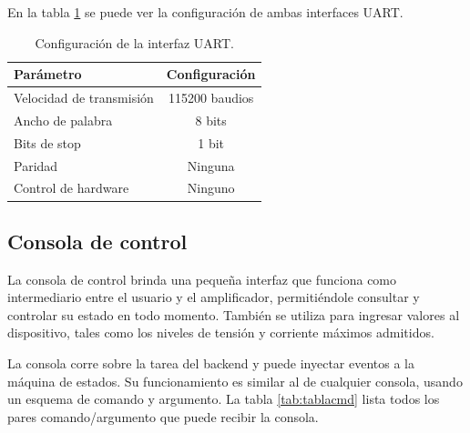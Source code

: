 En la tabla \ref{tab:configUART} se puede ver la configuración de ambas interfaces UART.

\begin{table}[H]
	\centering
	\caption{Configuración de la interfaz UART.}
	\begin{tabular}{l c}
		\toprule
		\textbf{Parámetro} & \textbf{Configuración} \\
		\midrule
		Velocidad de transmisión	& 115200 baudios \\
		Ancho de palabra 				& 8 bits \\
		Bits de stop						& 1 bit \\
		Paridad							    & Ninguna \\
		Control de hardware			& Ninguno \\
		\bottomrule
		\hline
	\end{tabular}
	\label{tab:configUART}
\end{table}

\subsection{Consola de control}


La consola de control brinda una pequeña interfaz que funciona como intermediario entre el usuario y el amplificador, permitiéndole consultar y controlar su estado en todo momento. También se utiliza para ingresar valores al dispositivo, tales como los niveles de tensión y corriente máximos admitidos.

La consola corre sobre la tarea del backend y puede inyectar eventos a la máquina de estados. Su funcionamiento es similar al de cualquier consola, usando un esquema de comando y argumento. La tabla \ref{tab:tablacmd} lista todos los pares comando/argumento que puede recibir la consola.

